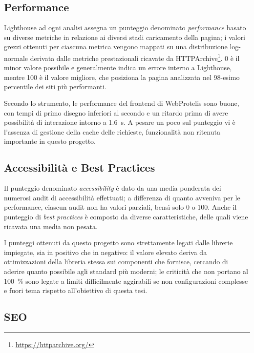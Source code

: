     \subsection{Performance}
      Lighthouse ad ogni analisi assegna un punteggio denominato \emph{performance} basato su diverse metriche in relazione ai diversi stadi caricamento della pagina;
      i valori grezzi ottenuti per ciascuna metrica vengono mappati su una distribuzione log-normale derivata dalle metriche prestazionali ricavate da HTTPArchive\footnote{\url{https://httparchive.org/}}.
      0 è il minor valore possibile e generalmente indica un errore interno a Lighthouse, mentre 100 è il valore migliore, che posiziona la pagina analizzata nel 98-esimo percentile dei siti più performanti.

      Secondo lo strumento, le performance %
      del frontend di WebProtelis sono buone, con tempi di primo disegno inferiori al secondo e un ritardo prima di avere possibilità di interazione intorno a \SI{1.6}{\second}.
      A pesare un poco sul punteggio vi è l'assenza di gestione della cache delle richieste, funzionalità non ritenuta importante in questo progetto.

    \subsection{Accessibilità e Best Practices}

    Il punteggio denominato \emph{accessibility} è dato da una media ponderata dei numerosi audit di accessibilità effettuati;
    a differenza di quanto avveniva per le performance, ciascun audit non ha valori parziali, bensì solo 0 o 100.
    Anche il punteggio di \emph{best practices} è composto da diverse caratteristiche, delle quali viene ricavata una media non pesata.

    I punteggi ottenuti da questo progetto sono strettamente legati dalle librerie impiegate, sia in positivo che in negativo:
    il valore elevato deriva da ottimizzazioni della libreria stessa sui componenti che fornisce, cercando di aderire quanto possibile agli standard più moderni;
    le criticità che non portano al \SI{100}{\percent} sono legate a limiti difficilmente aggirabili se non configurazioni complesse e fuori tema rispetto all'obiettivo di questa tesi.

    \subsection{SEO}

